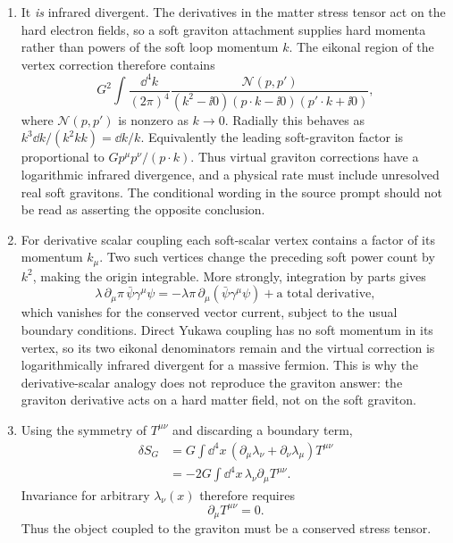 \begin{enumerate}
\begin{enumerate}
\item
It \emph{is} infrared divergent.  The derivatives in the matter stress
tensor act on the hard electron fields, so a soft graviton attachment
supplies hard momenta rather than powers of the soft loop momentum \(k\).
The eikonal region of the vertex correction therefore contains
\[
 G^2\int\frac{\dd^4k}{(2\pi)^4}
 \frac{\mathcal N(p,p')}
 {(k^2-\ii0)(p\cdot k-\ii0)(p'\cdot k+\ii0)},
\]
where \(\mathcal N(p,p')\) is nonzero as \(k\to0\).  Radially this behaves
as \(k^3\dd k/(k^2kk)=\dd k/k\).  Equivalently the leading soft-graviton factor
is proportional to \(Gp^\mu p^\nu/(p\cdot k)\).  Thus virtual graviton
corrections have a logarithmic infrared divergence, and a physical rate
must include unresolved real soft gravitons.  The conditional wording in
the source prompt should not be read as asserting the opposite conclusion.
\item
For derivative scalar coupling each soft-scalar vertex contains a factor
of its momentum \(k_\mu\).  Two such vertices change the preceding soft
power count by \(k^2\), making the origin integrable.  More strongly,
integration by parts gives
\[
 \lambda\,\partial_\mu\pi\,\bar\psi\gamma^\mu\psi
 =-\lambda\pi\,\partial_\mu(\bar\psi\gamma^\mu\psi)
 +\text{a total derivative},
\]
which vanishes for the conserved vector current, subject to the usual
boundary conditions.  Direct Yukawa coupling has no soft momentum in its
vertex, so its two eikonal denominators remain and the virtual correction
is logarithmically infrared divergent for a massive fermion.  This is why
the derivative-scalar analogy does not reproduce the graviton answer: the
graviton derivative acts on a hard matter field, not on the soft graviton.
\item
Using the symmetry of \(T^{\mu\nu}\) and discarding a boundary term,
\[
 \begin{split}
 \delta S_G
 &=G\int \dd^4x\,
 (\partial_\mu\lambda_\nu+\partial_\nu\lambda_\mu)T^{\mu\nu}\\
 &=-2G\int \dd^4x\,\lambda_\nu\partial_\mu T^{\mu\nu}.
 \end{split}
\]
Invariance for arbitrary \(\lambda_\nu(x)\) therefore requires
\[
 \boxed{\partial_\mu T^{\mu\nu}=0}.
\]
Thus the object coupled to the graviton must be a conserved stress tensor.
\end{enumerate}
\end{enumerate}
